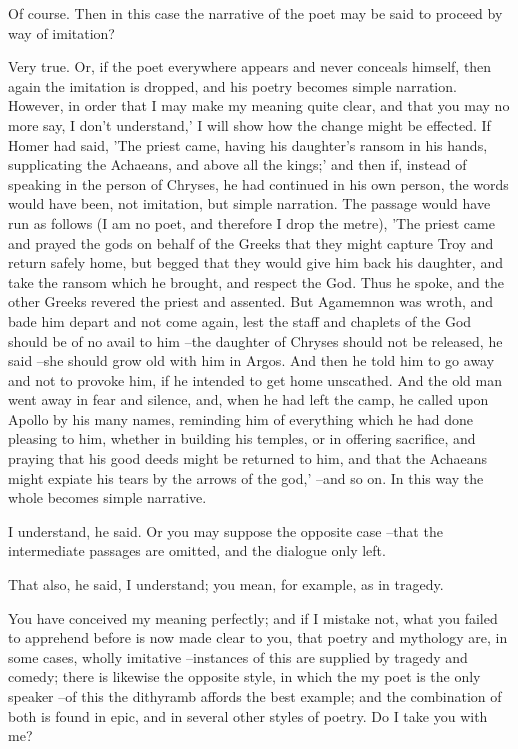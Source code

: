 Of course.
Then in this case the narrative of the poet may be said to proceed by way of imitation?

Very true.
Or, if the poet everywhere appears and never conceals himself, then again the imitation is dropped, and his poetry becomes simple narration. However, in order that I may make my meaning quite clear, and that you may no more say, I don't understand,' I will show how the change might be effected. If Homer had said, 'The priest came, having his daughter's ransom in his hands, supplicating the Achaeans, and above all the kings;' and then if, instead of speaking in the person of Chryses, he had continued in his own person, the words would have been, not imitation, but simple narration. The passage would have run as follows (I am no poet, and therefore I drop the metre), 'The priest came and prayed the gods on behalf of the Greeks that they might capture Troy and return safely home, but begged that they would give him back his daughter, and take the ransom which he brought, and respect the God. Thus he spoke, and the other Greeks revered the priest and assented. But Agamemnon was wroth, and bade him depart and not come again, lest the staff and chaplets of the God should be of no avail to him --the daughter of Chryses should not be released, he said --she should grow old with him in Argos. And then he told him to go away and not to provoke him, if he intended to get home unscathed. And the old man went away in fear and silence, and, when he had left the camp, he called upon Apollo by his many names, reminding him of everything which he had done pleasing to him, whether in building his temples, or in offering sacrifice, and praying that his good deeds might be returned to him, and that the Achaeans might expiate his tears by the arrows of the god,' --and so on. In this way the whole becomes simple narrative.

I understand, he said.
Or you may suppose the opposite case --that the intermediate passages are omitted, and the dialogue only left.

That also, he said, I understand; you mean, for example, as in tragedy.

You have conceived my meaning perfectly; and if I mistake not, what you failed to apprehend before is now made clear to you, that poetry and mythology are, in some cases, wholly imitative --instances of this are supplied by tragedy and comedy; there is likewise the opposite style, in which the my poet is the only speaker --of this the dithyramb affords the best example; and the combination of both is found in epic, and in several other styles of poetry. Do I take you with me?

